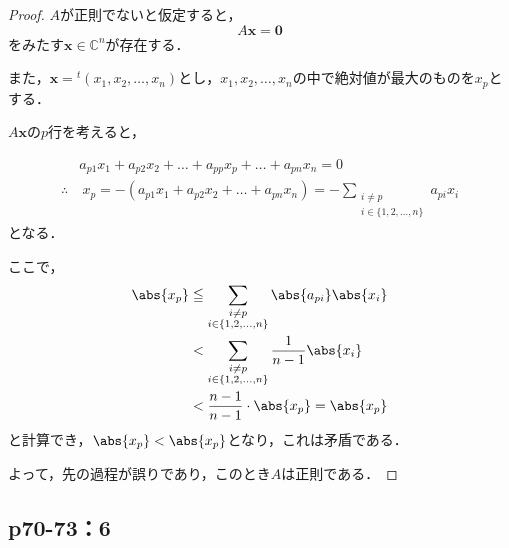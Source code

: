 \documentclass[uplatex,dvipdfmx,a4paper,10pt,fleqn]{jsarticle}
\begin{document}
    \begin{leftbar}
        \begin{proof}
        $A$が正則でないと仮定すると，
        \[
           A \bm{x} = \bm{0}
        \]
        をみたす$\bm{x} \in \mathbb{C}^n$が存在する．

        また，$\bm{x} ={} ^t (x_1,x_2,\dots,x_n)$とし，$x_1,x_2,\dots,x_n$の中で絶対値が最大のものを$x_p$とする．
        
        $A \bm{x}$の$p$行を考えると，

        \begin{align*}
             & a_{p1} x_1 + a_{p2} x_2 + \dots + a_{pp} x_p + \dots + a_{pn} x_n = 0 \\
             \therefore & ~ x_p = -(a_{p1}x_1 + a_{p2} x_2+ \dots + a_{pn} x_n) =- \sum_{\substack{i \ne p \\ i \in \{1,2,\dots,n\}}} a_{pi} x_i 
        \end{align*}
        となる．

        ここで，
        \begin{align*} 
            \abs{x_p} & \leqq \sum_{\substack{i \ne p \\ i \in \{1,2,\dots,n\}}} \abs{a_{pi}} \abs{x_i} \\
            & < \sum_{\substack{i \ne p \\ i \in \{1,2,\dots,n\}}} \frac{1}{n-1} \abs{x_i} \\
            & < \frac{n-1}{n-1} \cdot \abs{x_p} =\abs{x_p}
        \end{align*} 
        と計算でき，$ \abs{x_p} < \abs{x_p}$となり，これは矛盾である．

        よって，先の過程が誤りであり，このとき$A$は正則である．
    \end{proof}
\end{leftbar}
    \newpage 

    \subsection*{p70-73：6}
\end{document}

